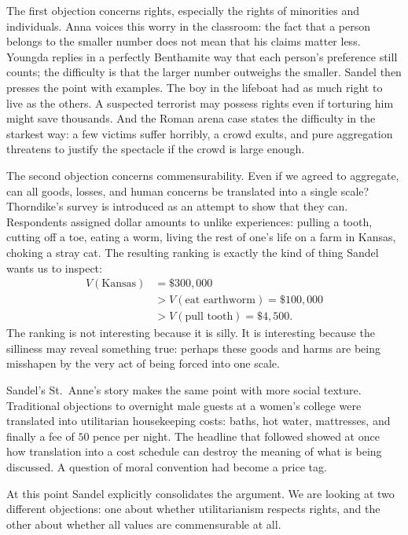 The first objection concerns rights, especially the rights of minorities and individuals. Anna voices this worry in the classroom: the fact that a person belongs to the smaller number does not mean that his claims matter less. Youngda replies in a perfectly Benthamite way that each person's preference still counts; the difficulty is that the larger number outweighs the smaller. Sandel then presses the point with examples. The boy in the lifeboat had as much right to live as the others. A suspected terrorist may possess rights even if torturing him might save thousands. And the Roman arena case states the difficulty in the starkest way: a few victims suffer horribly, a crowd exults, and pure aggregation threatens to justify the spectacle if the crowd is large enough.

The second objection concerns commensurability. Even if we agreed to aggregate, can all goods, losses, and human concerns be translated into a single scale? Thorndike's survey is introduced as an attempt to show that they can. Respondents assigned dollar amounts to unlike experiences: pulling a tooth, cutting off a toe, eating a worm, living the rest of one's life on a farm in Kansas, choking a stray cat. The resulting ranking is exactly the kind of thing Sandel wants us to inspect:
\begin{equation}
\begin{aligned}
V(\text{Kansas}) &= \$300{,}000 \\
&> V(\text{eat earthworm}) = \$100{,}000 \\
&> V(\text{pull tooth}) = \$4{,}500.
\end{aligned}
\end{equation}
The ranking is not interesting because it is silly. It is interesting because the silliness may reveal something true: perhaps these goods and harms are being misshapen by the very act of being forced into one scale.

Sandel's St.\ Anne's story makes the same point with more social texture. Traditional objections to overnight male guests at a women's college were translated into utilitarian housekeeping costs: baths, hot water, mattresses, and finally a fee of \(50\) pence per night. The headline that followed showed at once how translation into a cost schedule can destroy the meaning of what is being discussed. A question of moral convention had become a price tag.

At this point Sandel explicitly consolidates the argument. We are looking at two different objections: one about whether utilitarianism respects rights, and the other about whether all values are commensurable at all.


